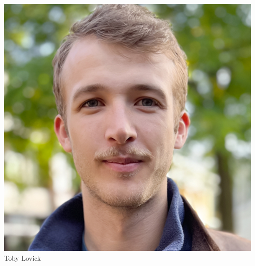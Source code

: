 \documentclass[aspectratio=169]{beamer}
\begin{document}
\begin{frame}
\begin{columns}
        \includegraphics[width=\textwidth]{people/toby_lovick}
\tiny{Toby Lovick}

    \end{columns}
\end{frame}
\end{document}
